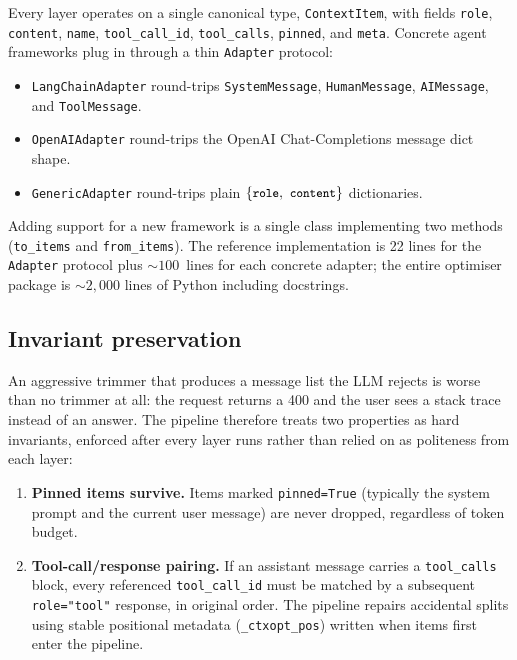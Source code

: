 \documentclass{article}
\newcommand{\code}[1]{\texttt{\small #1}}
\begin{document}
Every layer operates on a single canonical type, \code{ContextItem}, with
fields \code{role}, \code{content}, \code{name}, \code{tool\_call\_id},
\code{tool\_calls}, \code{pinned}, and \code{meta}. Concrete agent
frameworks plug in through a thin \code{Adapter} protocol:

\begin{itemize}\setlength{\itemsep}{0pt}
  \item \code{LangChainAdapter} round-trips \code{SystemMessage},
        \code{HumanMessage}, \code{AIMessage}, and \code{ToolMessage}.
  \item \code{OpenAIAdapter} round-trips the OpenAI Chat-Completions
        message dict shape.
  \item \code{GenericAdapter} round-trips plain
        $\{\code{role},\ \code{content}\}$ dictionaries.
\end{itemize}

Adding support for a new framework is a single class implementing two
methods (\code{to\_items} and \code{from\_items}). The reference
implementation is 22 lines for the \code{Adapter} protocol plus
${\sim}100$~lines for each concrete adapter; the entire optimiser
package is ${\sim}2{,}000$ lines of Python including docstrings.

\subsection{Invariant preservation}
\label{sec:invariants}

An aggressive trimmer that produces a message list the LLM rejects is
worse than no trimmer at all: the request returns a 400 and the user
sees a stack trace instead of an answer. The pipeline therefore
treats two properties as hard invariants, enforced after every layer
runs rather than relied on as politeness from each layer:

\begin{enumerate}\setlength{\itemsep}{0pt}
  \item \textbf{Pinned items survive.} Items marked \code{pinned=True}
        (typically the system prompt and the current user message) are
        never dropped, regardless of token budget.
  \item \textbf{Tool-call/response pairing.} If an assistant message
        carries a \code{tool\_calls} block, every referenced
        \code{tool\_call\_id} must be matched by a subsequent
        \code{role="tool"} response, in original order. The pipeline
        repairs accidental splits using stable positional metadata
        (\code{\_ctxopt\_pos}) written when items first enter the
        pipeline.
\end{enumerate}
\end{document}
